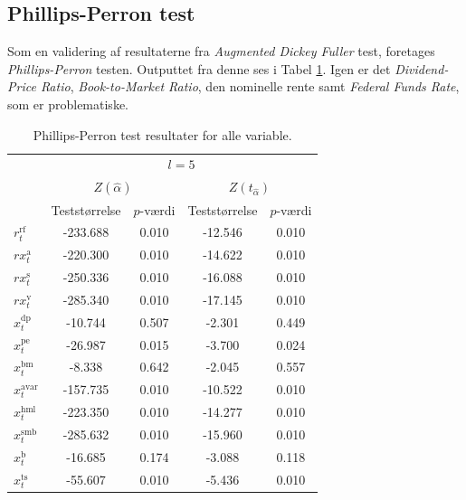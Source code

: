 \documentclass[
  a4paper,
  oneside]{memoir}
\begin{document}
\hypertarget{philper}{%
\subsection{Phillips-Perron test}\label{philper}}

Som en validering af resultaterne fra \emph{Augmented Dickey Fuller} test, foretages \emph{Phillips-Perron} testen. Outputtet fra denne ses i Tabel \ref{tab:STAT-PP}. Igen er det \emph{Dividend-Price Ratio}, \emph{Book-to-Market Ratio}, den nominelle rente samt \emph{Federal Funds Rate}, som er problematiske.

\begin{table}[H]

\caption{\label{tab:STAT-PP}Phillips-Perron test resultater for alle variable.}
\centering
\begin{threeparttable}
\begin{tabular}[t]{lcccc}
\toprule
\multicolumn{1}{c}{ } & \multicolumn{4}{c}{$l=5$} \\
\cmidrule(l{3pt}r{3pt}){2-5}
\multicolumn{1}{c}{ } & \multicolumn{2}{c}{$Z(\hat{\alpha})$} & \multicolumn{2}{c}{$Z(t_{\hat{\alpha}})$} \\
\cmidrule(l{3pt}r{3pt}){2-3} \cmidrule(l{3pt}r{3pt}){4-5}
  & Teststørrelse & $p$-værdi & Teststørrelse & $p$-værdi\\
\midrule
\rowcolor{gray!6}  $r_t^{\text{rf}}$ & -233.688 & 0.010 & -12.546 & 0.010\\
$rx_t^{\text{a}}$ & -220.300 & 0.010 & -14.622 & 0.010\\
\rowcolor{gray!6}  $rx_t^{\text{s}}$ & -250.336 & 0.010 & -16.088 & 0.010\\
$rx_t^{\text{v}}$ & -285.340 & 0.010 & -17.145 & 0.010\\
\rowcolor{gray!6}  $x_t^{\text{dp}}$ & -10.744 & 0.507 & -2.301 & 0.449\\
$x_t^{\text{pe}}$ & -26.987 & 0.015 & -3.700 & 0.024\\
\rowcolor{gray!6}  $x_t^{\text{bm}}$ & -8.338 & 0.642 & -2.045 & 0.557\\
$x_t^{\text{avar}}$ & -157.735 & 0.010 & -10.522 & 0.010\\
\rowcolor{gray!6}  $x_t^{\text{hml}}$ & -223.350 & 0.010 & -14.277 & 0.010\\
$x_t^{\text{smb}}$ & -285.632 & 0.010 & -15.960 & 0.010\\
\rowcolor{gray!6}  $x_t^{\text{b}}$ & -16.685 & 0.174 & -3.088 & 0.118\\
$x_t^{\text{ts}}$ & -55.607 & 0.010 & -5.436 & 0.010\\

\end{tabular}
\end{threeparttable}
\end{table}
\end{document}
